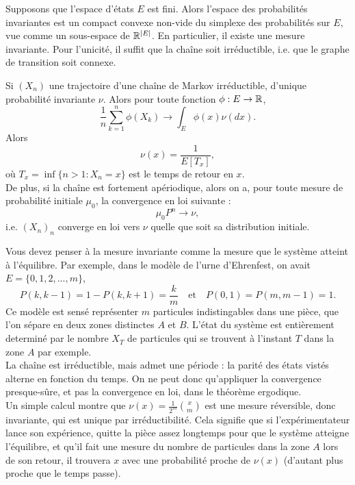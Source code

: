 Supposons que l'espace d'états $E$ est fini. Alors l'espace des probabilités invariantes est un compact convexe non-vide du simplexe des probabilités sur $E$, vue comme un sous-espace de $\mathbb R^{|E|}$. En particulier, il existe une mesure invariante. Pour l'unicité, il suffit que la chaîne soit irréductible, i.e. que le graphe de transition soit connexe. 

\begin{thm}
Si $(X_n)$ une trajectoire d'une chaîne de Markov irréductible, d'unique probabilité invariante $\nu$. Alors pour toute fonction $\phi :E\rightarrow \mathbb R$, 
\[\frac{1}{n}\sum_{k=1}^n \phi(X_k) \rightarrow \int_E \phi(x)\nu(dx).\]
Alors \[\nu(x)=\frac{1}{E[T_x]},\]
où $T_x=\inf\{n>1 : X_n = x\}$ est le temps de retour en $x$.\\
De plus, si la chaîne est fortement apériodique, alors on a, pour toute mesure de probabilité initiale $\mu_0$, la convergence en loi suivante :
\[\mu_0 P^n \rightarrow \nu, \]
i.e. $(X_n)_n$ converge en loi vers $\nu$ quelle que soit sa distribution initiale.
\end{thm}

Vous devez penser à la mesure invariante comme la mesure que le système atteint à l'équilibre. Par exemple, dans le modèle de l'urne d'Ehrenfest, on avait $E=\{0,1,2,...,m\}$, 
\[P(k,k-1)=1-P(k,k+1)=\frac{k}{m} \quad \text{et}\quad P(0,1)=P(m,m-1)=1.\]
Ce modèle est sensé représenter $m$ particules indistingables dans une pièce, que l'on sépare en deux zones distinctes $A$ et $B$. L'état du système est entièrement determiné par le nombre $X_T$ de particules qui se trouvent à l'instant $T$ dans la zone $A$ par exemple.\\

La chaîne est irréductible, mais admet une période : la parité des états vistés alterne en fonction du temps. On ne peut donc qu'appliquer la convergence presque-sûre, et pas la convergence en loi, dans le théorème ergodique.\\

Un simple calcul montre que $\nu(x)=\frac{1}{2^m}\binom{x}{m}$ est une mesure réversible, donc invariante, qui est unique par irréductibilité. Cela signifie que si l'expérimentateur lance son expérience, quitte la pièce assez longtemps pour que le système atteigne l'équilibre, et qu'il fait une mesure du nombre de particules dans la zone $A$ lors de son retour, il trouvera $x$ avec une probabilité proche de $\nu(x)$ (d'autant plus proche que le temps passe).\\


